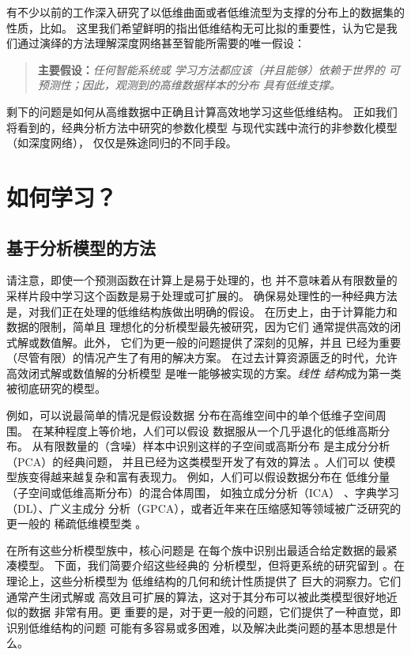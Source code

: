 \documentclass[../../book-main_zh.tex]{subfiles}
\begin{document}
有不少以前的工作深入研究了以低维曲面或者低维流型为支撑的分布上的数据集的性质，比如\cite{ALLARD2012435,LITTLE2017504}。
这里我们希望鲜明的指出低维结构无可比拟的重要性，认为它是我们通过演绎的方法理解深度网络甚至智能所需要的唯一假设：
\begin{quote}
    \textbf{主要假设：}\textit{任何智能系统或
        学习方法都应该（并且能够）依赖于世界的
        可预测性；因此，观测到的高维数据样本的分布
    具有低维支撑。}
\end{quote}
剩下的问题是如何从高维数据中正确且计算高效地学习这些低维结构。
正如我们将看到的，经典分析方法中研究的参数化模型
与现代实践中流行的非参数化模型（如深度网络），
仅仅是殊途同归的不同手段。

\section{如何学习？}

\subsection{基于分析模型的方法}
\label{sec:analytical}
请注意，即使一个预测函数在计算上是易于处理的，也
并不意味着从有限数量的采样片段中学习这个函数是易于处理或可扩展的。
确保易处理性的一种经典方法是，对我们正在处理的低维结构族做出明确的假设。
在历史上，由于计算能力和数据的限制，简单且
理想化的分析模型最先被研究，因为它们
通常提供高效的闭式解或数值解。此外，
它们为更一般的问题提供了深刻的见解，并且
已经为重要（尽管有限）的情况产生了有用的解决方案。
在过去计算资源匮乏的时代，允许高效闭式解或数值解的分析模型
是唯一能够被实现的方案。\textit{线性
结构}成为第一类被彻底研究的模型。

例如，可以说最简单的情况是假设数据
分布在高维空间中的单个低维子空间周围。
在某种程度上等价地，人们可以假设
数据服从一个几乎退化的低维高斯分布。
从有限数量的（含噪）样本中识别这样的子空间或高斯分布
是主成分分析（PCA）的经典问题，
并且已经为这类模型开发了有效的算法 \cite{JolliffeI2002}。人们可以
使模型族变得越来越复杂和富有表现力。
例如，人们可以假设数据分布在
低维分量（子空间或低维高斯分布）的混合体周围，
如独立成分分析（ICA）
\cite{Ans-1985}、字典学习（DL）、广义主成分
分析（GPCA）\cite{Vidal-GPCA}，或者近年来在压缩感知等领域被广泛研究的更一般的
稀疏低维模型类
\cite{Wright-Ma-2022}。

在所有这些分析模型族中，核心问题是
在每个族中识别出最适合给定数据的最紧凑模型。
下面，我们简要介绍这些经典的
分析模型，但将更系统的研究留到
。在理论上，这些分析模型为
低维结构的几何和统计性质提供了
巨大的洞察力。它们通常产生闭式解或
高效且可扩展的算法，这对于其分布可以被此类模型很好地近似的数据
非常有用。更
重要的是，对于更一般的问题，它们提供了一种直觉，即识别低维结构的问题
可能有多容易或多困难，以及解决此类问题的基本思想是什么。
\end{document}
